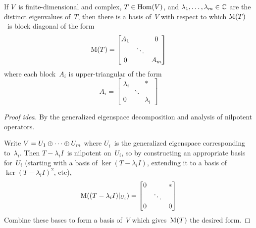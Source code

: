 \begin{thm}
If \(V\)~is finite-dimensional and complex, \(T\in\operatorname{Hom}(V)\), and \(\lambda_1,\ldots,\lambda_m\in\mathbb{C}\) are the distinct eigenvalues of~\(T\), then there is a basis of~\(V\) with respect to which \(\operatorname{M}(T)\)~is block diagonal of the form
\[\operatorname{M}(T)=\left[\begin{matrix}
A_1&&0\\
&\ddots&\\
0&&A_m
\end{matrix}\right]\]
where each block~\(A_i\) is upper-triangular of the form
\[A_i=\left[\begin{matrix}
\lambda_i&&*\\
&\ddots&\\
0&&\lambda_i
\end{matrix}\right]\]
\end{thm}
\begin{proof}[Proof idea]
By the generalized eigenspace decomposition and analysis of nilpotent operators.

Write \(V=U_1\oplus\cdots\oplus U_m\) where \(U_i\)~is the generalized eigenspace corresponding to~\(\lambda_i\). Then \(T-\lambda_i I\)~is nilpotent on~\(U_i\), so by constructing an appropriate basis for~\(U_i\) (starting with a basis of \(\ker(T-\lambda_i I)\), extending it to a basis of \(\ker(T-\lambda_i I)^2\), etc),
\[\operatorname{M}((T-\lambda_i I)|_{U_i})=\left[\begin{matrix}
0&&*\\
&\ddots&\\
0&&0
\end{matrix}\right]\]
Combine these bases to form a basis of~\(V\) which gives~\(\operatorname{M}(T)\) the desired form.
\end{proof}

